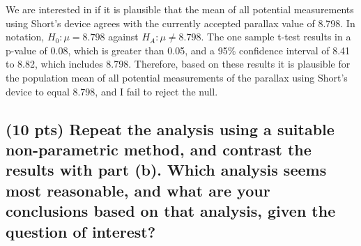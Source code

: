 \documentclass{article}\usepackage[]{graphicx}\usepackage[]{color}
\begin{document}
We are interested in if it is plausible that the mean of all potential measurements using
Short's device agrees with the currently accepted parallax value of 8.798.  In notation,
$H_0: \mu = 8.798$ against $H_A: \mu \ne 8.798$.  The one sample t-test results in a p-value
 of 0.08, which is greater than 0.05, and a 95\% confidence interval of 8.41 to 8.82, which
 includes 8.798.  Therefore, based on these results it is plausible for the population mean
 of all potential measurements of the parallax using Short's device to equal 8.798, and I fail
 to reject the null.

\subsection{(10 pts) Repeat the analysis using a suitable non-parametric method, and contrast the results with
part (b). Which analysis seems most reasonable, and what are your conclusions based on that analysis, given the question of interest?}
\end{document}
